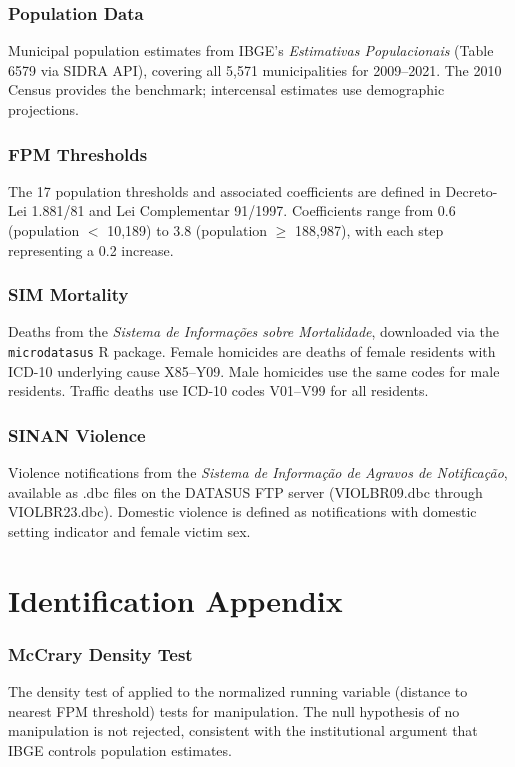 \documentclass[12pt]{article}
\begin{document}
\subsubsection*{Population Data} Municipal population estimates from IBGE's \textit{Estimativas Populacionais} (Table 6579 via SIDRA API), covering all 5,571 municipalities for 2009--2021. The 2010 Census provides the benchmark; intercensal estimates use demographic projections.

\subsubsection*{FPM Thresholds} The 17 population thresholds and associated coefficients are defined in Decreto-Lei 1.881/81 and Lei Complementar 91/1997. Coefficients range from 0.6 (population $<$ 10,189) to 3.8 (population $\geq$ 188,987), with each step representing a 0.2 increase.

\subsubsection*{SIM Mortality} Deaths from the \textit{Sistema de Informa\c{c}\~{o}es sobre Mortalidade}, downloaded via the \texttt{microdatasus} R package. Female homicides are deaths of female residents with ICD-10 underlying cause X85--Y09. Male homicides use the same codes for male residents. Traffic deaths use ICD-10 codes V01--V99 for all residents.

\subsubsection*{SINAN Violence} Violence notifications from the \textit{Sistema de Informa\c{c}\~{a}o de Agravos de Notifica\c{c}\~{a}o}, available as .dbc files on the DATASUS FTP server (VIOLBR09.dbc through VIOLBR23.dbc). Domestic violence is defined as notifications with domestic setting indicator and female victim sex.

\section{Identification Appendix}
\label{sec:id_appendix}

\subsubsection*{McCrary Density Test} The density test of \citet{cattaneo2020density} applied to the normalized running variable (distance to nearest FPM threshold) tests for manipulation. The null hypothesis of no manipulation is not rejected, consistent with the institutional argument that IBGE controls population estimates.
\end{document}
